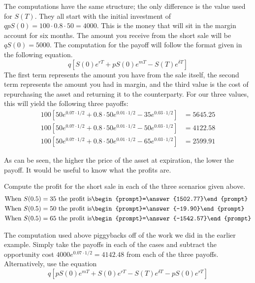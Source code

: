 \documentclass{ximera}
\begin{document}
\begin{solution}
The computations have the same structure; the only difference is the value used for $S(T)$. They all start with the initial investment of $qpS(0)=100\cdot 0.8\cdot 50=4000$. This is the money that will sit in the margin account for six months. The amount you receive from the short sale will be $qS(0)=5000$. The computation for the payoff will follow the format given in the following equation.
	\begin{equation*}
	q[S(0)e^{rT}+pS(0)e^{mT}-S(T)e^{\delta T}]
	\end{equation*}
The first term represents the amount you have from the sale itself, the second term represents the amount you had in margin, and the third value is the cost of repurchasing the asset and returning it to the counterparty. For our three values, this will yield the following three payoffs:
	\begin{align*}
	100[50e^{0.07\cdot 1/2}+0.8\cdot 50e^{0.01\cdot 1/2}-35e^{0.03\cdot 1/2}]&=5645.25\\
	100[50e^{0.07\cdot 1/2}+0.8\cdot 50e^{0.01\cdot 1/2}-50e^{0.03\cdot 1/2}]&=4122.58\\
	100[50e^{0.07\cdot 1/2}+0.8\cdot 50e^{0.01\cdot 1/2}-65e^{0.03\cdot 1/2}]&=2599.91
	\end{align*}
\end{solution}

As can be seen, the higher the price of the asset at expiration, the lower the payoff. It would be useful to know what the profits are.

\begin{question}
Compute the profit for the short sale in each of the three scenarios given above.
	\begin{align*}
	\text{When }S(0.5)=35\text{ the profit is}&\begin{prompt}=\answer{1502.77}\end{prompt}\\
	\text{When }S(0.5)=50\text{ the profit is}&\begin{prompt}=\answer{-19.90}\end{prompt}\\
	\text{When }S(0.5)=65\text{ the profit is}&\begin{prompt}=\answer{-1542.57}\end{prompt}
	\end{align*}
\end{question}

\begin{solution}
The computation used above piggybacks off of the work we did in the earlier example. Simply take the payoffs in each of the cases and subtract the opportunity cost $4000e^{0.07\cdot 1/2}=4142.48$ from each of the three payoffs. Alternatively, use the equation
	\begin{equation*}
	q[pS(0)e^{mT}+S(0)e^{rT}-S(T)e^{\delta T}-pS(0)e^{rT}]
	\end{equation*}
\end{solution}
\end{document}
